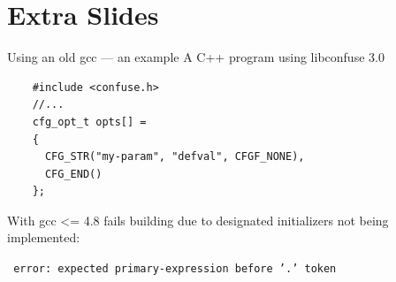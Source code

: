 \documentclass[xetex,table]{beamer}
\begin{document}
\section{Extra Slides}

\begin{frame}[fragile]{Using an old gcc --- an example}
  A C++ program using libconfuse 3.0

  \begin{verbatim}
    #include <confuse.h>
    //...
    cfg_opt_t opts[] =
    {
      CFG_STR("my-param", "defval", CFGF_NONE),
      CFG_END()
    };
  \end{verbatim}

  With gcc <= 4.8 fails building due to designated initializers not being implemented:

  \texttt{ error: expected primary-expression before '.' token}
\end{frame}
\end{document}
